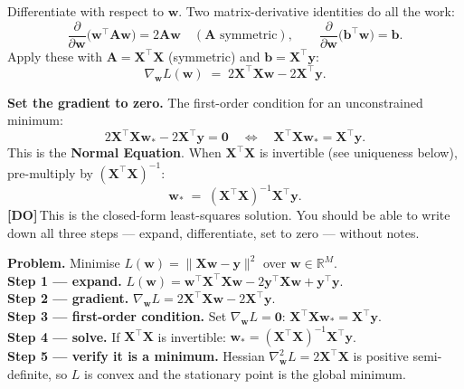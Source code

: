 \documentclass[11pt, a4paper]{article}
\newcommand{\doflag}{\textcolor{defBd}{\textbf{[DO]}}\,}
\begin{document}
Differentiate with respect to $\mathbf{w}$. Two matrix-derivative identities do all the work:
\[
\frac{\partial}{\partial\mathbf{w}}\big(\mathbf{w}^\top\mathbf{A}\mathbf{w}\big) = 2\mathbf{A}\mathbf{w} \quad (\mathbf{A}\text{ symmetric}),
\qquad
\frac{\partial}{\partial\mathbf{w}}\big(\mathbf{b}^\top\mathbf{w}\big) = \mathbf{b}.
\]
Apply these with $\mathbf{A} = \mathbf{X}^\top\mathbf{X}$ (symmetric) and $\mathbf{b} = \mathbf{X}^\top\mathbf{y}$:
\[
\nabla_\mathbf{w} L(\mathbf{w}) \;=\; 2\mathbf{X}^\top\mathbf{X}\mathbf{w} - 2\mathbf{X}^\top\mathbf{y}.
\]

\textbf{Set the gradient to zero.} The first-order condition for an unconstrained minimum:
\[
2\mathbf{X}^\top\mathbf{X}\mathbf{w}_* - 2\mathbf{X}^\top\mathbf{y} = \mathbf{0}
\quad\Longleftrightarrow\quad
\mathbf{X}^\top\mathbf{X}\mathbf{w}_* = \mathbf{X}^\top\mathbf{y}.
\]
This is the \textbf{Normal Equation}. When $\mathbf{X}^\top\mathbf{X}$ is invertible (see uniqueness below), pre-multiply by $(\mathbf{X}^\top\mathbf{X})^{-1}$:
\[
\boxed{\;\mathbf{w}_* \;=\; (\mathbf{X}^\top\mathbf{X})^{-1}\mathbf{X}^\top\mathbf{y}.\;}
\]
\doflag{}This is the closed-form least-squares solution. You should be able to write down all three steps — expand, differentiate, set to zero — without notes.

\begin{exbox}
\textbf{Problem.} Minimise $L(\mathbf{w}) = \|\mathbf{X}\mathbf{w}-\mathbf{y}\|^2$ over $\mathbf{w}\in\mathbb{R}^M$.\\[0.3em]
\textbf{Step 1 — expand.} $L(\mathbf{w}) = \mathbf{w}^\top\mathbf{X}^\top\mathbf{X}\mathbf{w} - 2\mathbf{y}^\top\mathbf{X}\mathbf{w} + \mathbf{y}^\top\mathbf{y}$.\\[0.3em]
\textbf{Step 2 — gradient.} $\nabla_\mathbf{w} L = 2\mathbf{X}^\top\mathbf{X}\mathbf{w} - 2\mathbf{X}^\top\mathbf{y}$.\\[0.3em]
\textbf{Step 3 — first-order condition.} Set $\nabla_\mathbf{w} L = \mathbf{0}$: $\mathbf{X}^\top\mathbf{X}\mathbf{w}_* = \mathbf{X}^\top\mathbf{y}$.\\[0.3em]
\textbf{Step 4 — solve.} If $\mathbf{X}^\top\mathbf{X}$ is invertible: $\mathbf{w}_* = (\mathbf{X}^\top\mathbf{X})^{-1}\mathbf{X}^\top\mathbf{y}$.\\[0.3em]
\textbf{Step 5 — verify it is a minimum.} Hessian $\nabla^2_\mathbf{w} L = 2\mathbf{X}^\top\mathbf{X}$ is positive semi-definite, so $L$ is convex and the stationary point is the global minimum.
\end{exbox}
\end{document}
